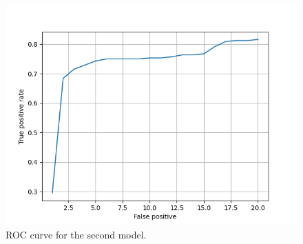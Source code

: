 \documentclass[9pt]{IEEEtran}
\begin{document}
\begin{figure}[h]
    \centering
    \includegraphics[width=1\columnwidth]{plot_a.png}
    \caption{ROC curve for the second model.}
    \label{fig:plot_a}
\end{figure}



\end{document}
